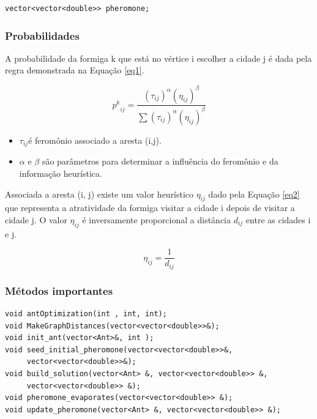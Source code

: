 \documentclass[a4paper, 12pt]{article}
\begin{document}
\begin{lstlisting}
vector<vector<double>> pheromone;
\end{lstlisting}

\subsubsection{Probabilidades}

A probabilidade da formiga k que está no vértice i escolher a cidade j é dada pela regra demonstrada na Equação \ref{eq1}.

\begin{equation}
{p^k}_{ij} = \frac{(\tau_{ij})^\alpha(\eta_{ij})^\beta}{\sum(\tau_{ij})^\alpha(\eta_{ij})^\beta}
\label{eq1}
\end{equation}

\begin{itemize}
\item  $\tau_{ij}$é feromônio associado a aresta (i,j).\\
\item $\alpha$ e $\beta$ são parâmetros para determinar a influência do feromônio e da informação heurística.\\
\end{itemize}

Associada a aresta (i, j) existe um valor heurístico $\eta_{ij}$ dado pela Equação \ref{eq2} que representa a atratividade da formiga visitar a cidade i depois de visitar a cidade j. O valor $\eta_{ij}$ é inversamente proporcional a distância $d_{ij}$ entre as cidades i e j. 

\begin{equation}
\eta_{ij} =\frac{1}{d_{ij}}
\label{eq2}
\end{equation}

\subsubsection{Métodos importantes}

\begin{lstlisting}
void antOptimization(int , int, int);
void MakeGraphDistances(vector<vector<double>>&);
void init_ant(vector<Ant>&, int );
void seed_initial_pheromone(vector<vector<double>>&, 
     vector<vector<double>>&);
void build_solution(vector<Ant> &, vector<vector<double>> &, 
     vector<vector<double>> &);
void pheromone_evaporates(vector<vector<double>> &);
void update_pheromone(vector<Ant> &, vector<vector<double>> &);
\end{lstlisting}
\end{document}
